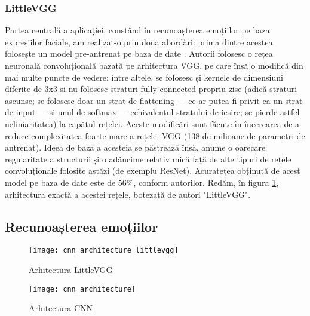 \documentclass{article}
\begin{document}
\subsubsection{LittleVGG}

Partea centrală a aplicației, constând în recunoașterea emoțiilor pe baza expresiilor faciale, am realizat-o prin două abordări: prima dintre acestea folosește un model pre-antrenat pe baza de date \cite{datasetlink}. Autorii folosesc o rețea neuronală convoluțională bazată pe arhitectura VGG, pe care însă o modifică din mai multe puncte de vedere: între altele, se folosesc și kernele de dimensiuni diferite de 3x3 și nu folosesc straturi fully-connected propriu-zise (adică straturi ascunse; se folosesc doar un strat de flattening --- ce ar putea fi privit ca un strat de input --- și unul de softmax --- echivalentul stratului de ieșire; se pierde astfel neliniaritatea) la capătul rețelei. Aceste modificări sunt făcute în încercarea de a reduce complexitatea foarte mare a rețelei VGG (138 de milioane de parametri de antrenat). Ideea de bază a acesteia se păstrează însă, anume o oarecare regularitate a structurii și o adâncime relativ mică față de alte tipuri de rețele convoluționale folosite astăzi (de exemplu ResNet). Acuratețea obținută de acest model pe baza de date \cite{emotions} este de 56\%, conform autorilor. Redăm, în figura \ref{littlevgg}, arhitectura exactă a acestei rețele, botezată de autori "LittleVGG".

\subsection{Recunoașterea emoțiilor}
\begin{figure}[t]
    \centering
    \texttt{[image: cnn\_architecture\_littlevgg]}
    \caption{Arhitectura LittleVGG}
    \label{littlevgg}
\end{figure}

\begin{figure}[t]
    \centering
    \texttt{[image: cnn\_architecture]}
    \caption{Arhitectura CNN}
    \label{myvgg}
\end{figure}
\end{document}
